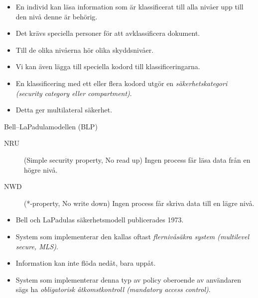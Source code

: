 \begin{frame}{\insertsubsectionhead}
  \begin{itemize}
    \item En individ kan läsa information som är klassificerat till alla nivåer 
      upp till den nivå denne är behörig.
    \item Det krävs speciella personer för att avklassificera dokument.
    \item Till de olika nivåerna hör olika skyddsnivåer.
  \end{itemize}
\end{frame}
\begin{frame}{\insertsubsectionhead}
  \begin{itemize}
    \item Vi kan även lägga till speciella kodord till klassificeringarna.
    \item En klassificering med ett eller flera kodord utgör en 
      \emph{säkerhetskategori (security category eller compartment)}.
    \item Detta ger multilateral säkerhet.
  \end{itemize}
\end{frame}
\begin{frame}{\insertsubsectionhead}
  \begin{block}{Bell--LaPadulamodellen (BLP)}
    \begin{description}
      \item[NRU] (Simple security property, No read up) Ingen process får läsa 
        data från en högre nivå.
      \item[NWD] (*-property, No write down) Ingen process får skriva data till 
        en lägre nivå.
    \end{description}
  \end{block}
  \begin{itemize}
    \item Bell och LaPadulas säkerhetsmodell publicerades 1973.
    \item System som implementerar den kallas oftast \emph{flernivåsäkra system 
      (multilevel secure, MLS)}.
    \item Information kan inte flöda nedåt, bara uppåt.
    \item System som implementerar denna typ av policy oberoende av användaren 
      sägs ha \emph{obligatorisk åtkomstkontroll (mandatory access control)}.
  \end{itemize}
\end{frame}
